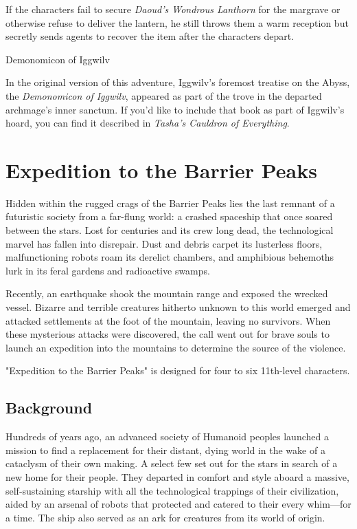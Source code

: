\documentclass[10pt,a4paper,twoside,bg=print,twocolumn,openany,nodeprecatedcode]{dndbook}
\begin{document}
If the characters fail to secure \textit{Daoud's Wondrous Lanthorn} for the margrave or otherwise refuse to deliver the lantern, he still throws them a warm reception but secretly sends agents to recover the item after the characters depart.

\begin{DndSidebar}[float=!b]{}
Demonomicon of Iggwilv



In the original version of this adventure, Iggwilv's foremost treatise on the Abyss, the \textit{Demonomicon of Iggwilv}, appeared as part of the trove in the departed archmage's inner sanctum. If you'd like to include that book as part of Iggwilv's hoard, you can find it described in \textit{Tasha's Cauldron of Everything}.



\end{DndSidebar}

\chapter{Expedition to the Barrier Peaks}
Hidden within the rugged crags of the Barrier Peaks lies the last remnant of a futuristic society from a far-flung world: a crashed spaceship that once soared between the stars. Lost for centuries and its crew long dead, the technological marvel has fallen into disrepair. Dust and debris carpet its lusterless floors, malfunctioning robots roam its derelict chambers, and amphibious behemoths lurk in its feral gardens and radioactive swamps.

Recently, an earthquake shook the mountain range and exposed the wrecked vessel. Bizarre and terrible creatures hitherto unknown to this world emerged and attacked settlements at the foot of the mountain, leaving no survivors. When these mysterious attacks were discovered, the call went out for brave souls to launch an expedition into the mountains to determine the source of the violence.

"Expedition to the Barrier Peaks" is designed for four to six 11th-level characters.

\section{Background}
Hundreds of years ago, an advanced society of Humanoid peoples launched a mission to find a replacement for their distant, dying world in the wake of a cataclysm of their own making. A select few set out for the stars in search of a new home for their people. They departed in comfort and style aboard a massive, self-sustaining starship with all the technological trappings of their civilization, aided by an arsenal of robots that protected and catered to their every whim—for a time. The ship also served as an ark for creatures from its world of origin.
\end{document}
